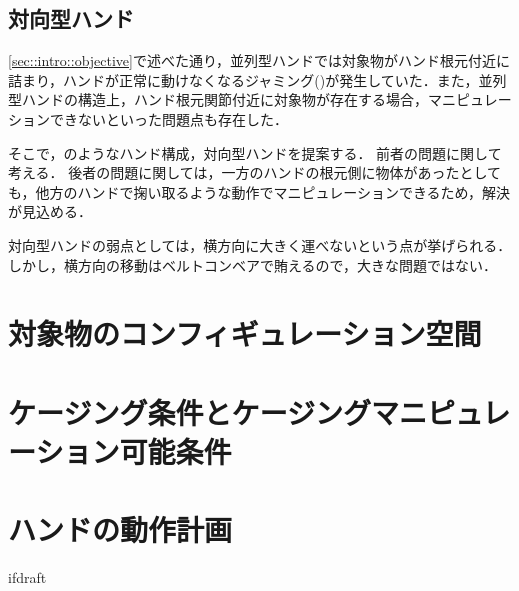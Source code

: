 \documentclass[a4paper,twoside,12pt,papersize, dvipdfmx]{iirthesis}
\begin{document}
\subsection{対向型ハンド}\label{subsec::sicm::oppositehand}
\ref{sec::intro::objective}で述べた通り，並列型ハンドでは対象物がハンド根元付近に詰まり，ハンドが正常に動けなくなるジャミング(\figref{})が発生していた．また，並列型ハンドの構造上，ハンド根元関節付近に対象物が存在する場合，マニピュレーションできないといった問題点も存在した．\par
そこで，\figref{}のようなハンド構成，対向型ハンドを提案する．
前者の問題に関して考える．%
後者の問題に関しては，一方のハンドの根元側に物体があったとしても，他方のハンドで掬い取るような動作でマニピュレーションできるため，解決が見込める．\par
対向型ハンドの弱点としては，横方向に大きく運べないという点が挙げられる．しかし，横方向の移動はベルトコンベアで賄えるので，大きな問題ではない．


\section{対象物のコンフィギュレーション空間}\label{sec::sicm::cspace}
\section{ケージング条件とケージングマニピュレーション可能条件}\label{sec::sicm::caging}
\section{ハンドの動作計画}\label{sec::scim::planning}




\expandafter\ifx\csname ifdraft\endcsname\relax
    
\end{document}

